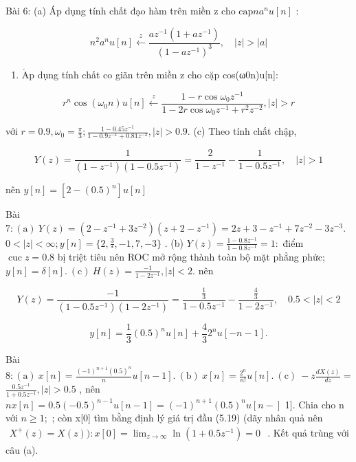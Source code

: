 \documentclass[
  10
]{article}
\providecommand{\tightlist}{%
  \setlength{\itemsep}{0pt}\setlength{\parskip}{0pt}}
\begin{document}
Bài 6: (a) Áp dụng tính chất đạo hàm trên miền z cho
\(\mathrm { c a p } n a ^ { n } u [ n ]\) :

\[
n ^ {2} a ^ {n} u [ n ] \xleftarrow {z} \frac {a z ^ {- 1} (1 + a z ^ {- 1})}{(1 - a z ^ {- 1}) ^ {3}}, \quad | z | > | a |
\]

\begin{enumerate}
\def\labelenumi{(\alph{enumi})}
\setcounter{enumi}{1}
\tightlist
\item
  \(\mathrm { { \acute { A } p } }\) dụng tính chất co giãn trên miền z
  cho cặp cos(ω0n)u{[}n{]}:
\end{enumerate}

\[
r ^ {n} \cos (\omega_ {0} n) u [ n ] \xleftarrow {z} \frac {1 - r \cos \omega_ {0} z ^ {- 1}}{1 - 2 r \cos \omega_ {0} z ^ {- 1} + r ^ {2} z ^ {- 2}}, | z | > r
\]

với
\(r = 0 . 9 , \omega _ { 0 } = \frac { \pi } { 3 } ; \frac { 1 - 0 . 4 5 z ^ { - 1 } } { 1 - 0 . 9 z ^ { - 1 } + 0 . 8 1 z ^ { - 2 } } , \left| z \right| > 0 . 9 .\)
(c) Theo tính chất chập,

\[
Y (z) = \frac {1}{(1 - z ^ {- 1}) (1 - 0 . 5 z ^ {- 1})} = \frac {2}{1 - z ^ {- 1}} - \frac {1}{1 - 0 . 5 z ^ {- 1}}, \quad | z | > 1
\]

nên \(y [ n ] = \left[ 2 - ( 0 . 5 ) ^ { n } \right] u [ n ]\)

Bài
\(7 \colon ( \mathrm { a } ) \ Y ( z ) = ( 2 - z ^ { - 1 } + 3 z ^ { - 2 } ) ( z + 2 - z ^ { - 1 } ) = 2 z + 3 - z ^ { - 1 } + 7 z ^ { - 2 } - 3 z ^ { - 3 } .\)
\(0 < | z | < \infty ; y [ n ] = \{ 2 , \frac { 3 } { * } , - 1 , 7 , - 3 \}\)
. (b)
\(Y ( z ) = { \frac { 1 - 0 . 8 z ^ { - 1 } } { 1 - 0 . 8 z ^ { - 1 } } } = 1 \mathrm { { : } }\)
điểm \(\operatorname { c u c } z = 0 . 8\) bị triệt tiêu nên ROC mở rộng
thành toàn bộ mặt phẳng phức;
\(y [ n ] = \delta [ n ] . \mathrm { \ ( c ) } \ H ( z ) = { \frac { - 1 } { 1 - 2 z ^ { - 1 } } } , | z | < 2 .\)
nên

\[
Y (z) = \frac {- 1}{(1 - 0 . 5 z ^ {- 1}) (1 - 2 z ^ {- 1})} = \frac {\frac {1}{3}}{1 - 0 . 5 z ^ {- 1}} - \frac {\frac {4}{3}}{1 - 2 z ^ {- 1}}, \quad 0. 5 <   | z | <   2
\]

\[
y [ n ] = \frac {1}{3} (0. 5) ^ {n} u [ n ] + \frac {4}{3} 2 ^ {n} u [ - n - 1 ].
\]

Bài
\(8 \colon ( \mathrm { a } ) \ x [ n ] = { \frac { ( - 1 ) ^ { n + 1 } ( 0 . 5 ) ^ { n } } { n } } u [ n - 1 ] . \ ( \mathrm { b } ) \ x [ n ] = { \frac { 2 ^ { n } } { n ! } } u [ n ] . \ ( \mathrm { c } ) \ - z { \frac { d X ( z ) } { d z } } =\)
\(\frac { 0 . 5 z ^ { - 1 } } { 1 + 0 . 5 z ^ { - 1 } } , | z | > 0 . 5\)
, nên
\(n x [ n ] = 0 . 5 ( - 0 . 5 ) ^ { n - 1 } u [ n - 1 ] = ( - 1 ) ^ { n + 1 } ( 0 . 5 ) ^ { n } u [ n - ]\)
1{]}. Chia cho n với \(n \geq 1 ;\) ; còn x{[}0{]} tìm bằng định lý giá
trị đầu (5.19) (dãy nhân quả nên
\(\begin{array} { r } { X ^ { + } ( z ) = X ( z ) ) \colon x [ 0 ] = \operatorname* { l i m } _ { z \to \infty } \ln ( 1 + 0 . 5 z ^ { - 1 } ) = 0 } \end{array}\)
. Kết quả trùng với câu (a).
\end{document}
